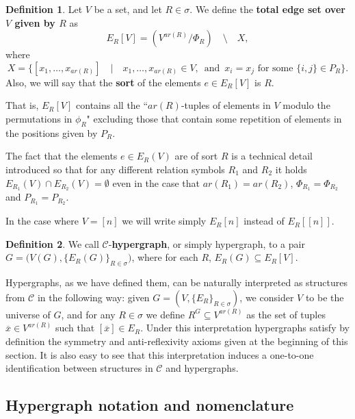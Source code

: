 \documentclass[12pt,notitlepage,a4paper]{article}
\theoremstyle{definition}
\newtheorem{definition}{Definition}[section]
\begin{document}
\begin{definition} 
	Let $V$ be a set, and let $R\in \sigma$.
	We define the \textbf{total edge set over $V$
	given by $R$} as
	\[ E_R[V]= (V^{ar(R)}/\Phi_R) \quad \setminus 
	\quad X, \]
	where
	\[
	X=
	\Big\{ [x_1,\dots,x_{ar(R)}]  
	\quad \Big| \quad
	x_1,\dots,x_{ar(R)}\in V, \,
	\text{ and } 
	 \, x_i=x_j \text{ for some } 
	\{i,j\}\in P_R \Big\}.
	\]
	Also, we will say that the \textbf{sort} of the elements $e\in E_R[V]$
	is $R$. 
\end{definition}

That is, $E_R[V]$ contains all the ``$ar(R)$-tuples of elements
in $V$ modulo the permutations
in $\phi_R$" 
excluding those that contain some repetition of elements in
the positions given by $P_R$.\par
The fact that the elements $e\in E_R(V)$ are of sort $R$ 
is a technical detail
introduced so that for any different relation symbols $R_1$ and
$R_2$ it holds $E_{R_1}(V)\cap E_{R_2}(V)=\emptyset$ even in the case
that $ar(R_1)=ar(R_2)$, $\Phi_{R_1}=\Phi_{R_2}$ and $P_{R_1}=P_{R_2}$.\par

In the case where $V=[n]$ we will write simply $E_R[n]$ instead
of $E_R[[n]]$.

\begin{definition} 
We call $\mathcal{C}$-\textbf{hypergraph}, or simply hypergraph, 
to a pair $G=\Big(V(G),\{E_R(G)\}_{R\in\sigma}\Big)$,
where for each $R$, $E_R(G) \subseteq E_R[V]$.
\end{definition}

Hypergraphs, as we have defined them, 
can be naturally interpreted as
structures from $\mathcal{C}$ 
in the following way: 
given $G=(V,\{E_R\}_{R\in \sigma})$,
we consider $V$ to be the universe of
 $G$, and for any $R\in \sigma$ we define
$R^G\subseteq V^{ar(R)}$ as the set of tuples
$\overline{x}\in V^{ar(R)}$ such that
$[\overline{x}]\in E_R$. Under 
this interpretation hypergraphs
satisfy by definition the 
symmetry and anti-reflexivity
axioms given at the beginning of this section. It is also easy to
see that this interpretation induces
a one-to-one identification between 
structures in $\mathcal{C}$ and hypergraphs. \par

\subsection{Hypergraph notation and nomenclature}
\end{document}
